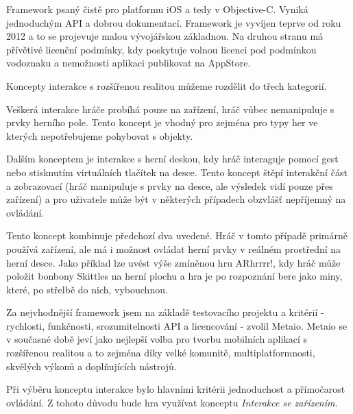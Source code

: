 \documentclass[oneside,12pt]{article}
\begin{document}
Framework psaný čistě pro platformu iOS a tedy v Objective-C. Vyniká jednoduchým API a dobrou dokumentací. Framework je vyvíjen teprve od roku 2012 a to se projevuje malou vývojářskou základnou. Na druhou stranu má přívětivé licenční podmínky, kdy poskytuje volnou licenci pod podmínkou vodoznaku a nemožnosti aplikaci publikovat na AppStore.

Koncepty interakce s rozšířenou realitou můžeme rozdělit do třech kategorií.

Veškerá interakce hráče probíhá pouze na zařízení, hráč vůbec nemanipuluje s prvky herního pole. Tento koncept je vhodný pro zejména pro typy her ve kterých nepotřebujeme pohybovat s objekty.

Dalším konceptem je interakce s herní deskou, kdy hráč interaguje pomocí gest nebo stisknutím virtuálních tlačítek na desce. Tento koncept štěpí interakční část a zobrazovací (hráč manipuluje s prvky na desce, ale výsledek vidí pouze přes zařízení) a pro uživatele může být v některých případech obzvlášť nepříjemný na ovládání.

Tento koncept kombinuje předchozí dva uvedené. Hráč v tomto případě primárně používá zařízení, ale má i možnost ovládat herní prvky v reálném prostřední na herní desce. Jako příklad lze uvést výše zmíněnou hru ARhrrrr!, kdy hráč může položit bonbony Skittles na herní plochu a hra je po rozpoznání bere jako miny, které, po střelbě do nich, vybouchnou.

Za nejvhodnější framework jsem na základě testovacího projektu a kritérií - rychlosti, funkčnosti, srozumitelnosti API a licencování - zvolil Metaio. Metaio se v současné době jeví jako nejlepší volba pro tvorbu mobilních aplikací s rozšířenou realitou a to zejména díky velké komunitě, multiplatformnosti, skvělých výkonů a doplňujících nástrojů. 

Při výběru konceptu interakce bylo hlavními kritérii jednoduchost a přímočarost ovládání. Z tohoto důvodu bude hra využívat konceptu \textit{Interakce se zařízením}.
\end{document}
